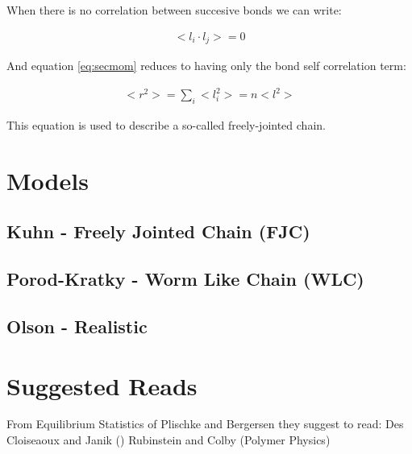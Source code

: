 When there is no correlation between succesive bonds we can write:

\begin{gather}
\label{eq:nocorr}
<l_{i} \cdot l_{j}> = 0
\end{gather}

And equation \ref{eq:secmom} reduces to having only the bond self
correlation term:

\begin{gather}
<r^2> = \sum_{i}<l_{i}^2> = n<l^2>
\end{gather}  

This equation is used to describe a so-called freely-jointed chain.


\section{Models}

\subsection{Kuhn - Freely Jointed Chain (FJC)}

\subsection{Porod-Kratky - Worm Like Chain (WLC)}

\subsection{Olson - Realistic}



\section{Suggested Reads}

From Equilibrium Statistics of Plischke and Bergersen they suggest to
read:
Des Cloiseaoux and Janik ()
Rubinstein and Colby (Polymer Physics)
